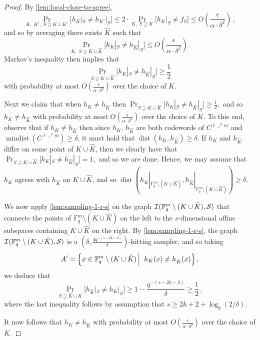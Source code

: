 \documentclass{toc}
\theoremstyle{plain}
\DeclareMathOperator{\dist}{dist} %
\DeclareMathOperator{\mindist}{mindist}  %
\newcommand{\F}{{\mathbb{F}}}
\newcommand{\calI}{{\mathcal{I}}}
\newcommand\sett[2]{\left\{ #1 \left| \; \vphantom{#1 #2} \right. #2  \right\}}
\begin{document}

\begin{proof}
By \cref{lem:local-close-to-agree},
\[
\Pr_{K, \; K',\; S \supseteq K \cup K'}\big[h_K|_S \neq h_{K'}|_S\big] \leq 2\cdot \Pr_{K, \; S \supseteq K}\big[h_K|_S \neq f_S\big] \leq O\left(\frac{\epsilon} {\alpha \cdot \delta^2}\right)\,,
\]
and so by averaging there exists $\hat K$ such that
\[
\Pr_{K, \; S \supseteq  K \cup \hat K}\big[h_{ K}|_S \neq h_{\hat K}|_S\big] \leq  O\left(\frac{\epsilon} {\alpha \cdot \delta^2}\right)\,.
\]
Markov's inequality then implies that
\[\Pr_{S \supseteq K \cup \hat K}\big[h_{ K}|_S \neq h_{ \hat K}|_S\big]  \geq \frac{1} {2}\]
with probability at most $O\left(\frac{\epsilon} {\alpha \cdot \delta^2}\right)$ over the choice of $K$.

%
Next we claim that when $h_{K} \neq h_{\hat K} $ then $\Pr_{S \supseteq K \cup \hat K}\big[h_{ K}|_S \neq h_{ \hat K}|_S\big]  \geq \frac{1} {2},$ and so $h_{K} \neq h_{\hat K}$ with probability at most $O\left(\frac{\epsilon} {\alpha \cdot \delta^2}\right)$ over the choice of $K$. To this end, observe that if $h_{K} \neq h_{\hat K} $ then since $h_{ K}$, $h_{ \hat K}$ are both codewords of $C^{\ell \nearrow m}$ and $\mindist(C^{\ell \nearrow m}) \geq \delta$, it must hold that $\dist(h_{ K}, h_{\hat K}) \geq \delta$. If $h_K$ and $h_{\hat K}$ differ on some point of $K \cup \hat K$, then we clearly have that $\Pr_{S \supseteq K \cup \hat K}\big[h_{ K}|_S \neq h_{ \hat K}|_S\big]  =1,$ and so we are done. Hence, we may assume that $h_K$ agrees with $h_{\hat K}$ on $K \cup \hat K$, and so $\dist \left(h_{ K}|_{ \F_q^m \setminus (K \cup \hat K)}, h_{\hat K}| _{  \F_q^m \setminus (K \cup \hat K)  } \right)\geq \delta$.

We now apply \cref{lem:sampling-1-r-s} on the graph $\calI ( \F_q^m \setminus (K \cup \hat K),\cal S )$ that connects the points of $\F_q^m\setminus (K \cup \hat K)$ on the left to the $s$-dimensional affine subspaces containing $K \cup \hat K$ on the right. By \cref{lem:sampling-1-r-s}, the graph $\calI ( \F_q^m \setminus (K \cup \hat K),\cal S )$ is a $(\delta, \frac{4q^{-(s-2k-2)} } {\delta})$-hitting sampler, and so taking
%
\[
A'=\sett{x\in \F_q^m \setminus (K \cup \hat K)}{h_{ K}(x)\neq h_{\hat K}(x)},
\]
we deduce that
\[
\Pr_{S \supseteq \hat K \cup K}\big[h_{\hat K}|_S \neq h_{K}|_S\big] \geq 1- \frac{ q^{-(s-2k-2)}} {\delta} \geq \frac12\,,
\]
where the last inequality follows by assumption that $s \geq 2k +2+\log_q(2/\delta)$.

%
%
%
%
%

It now follows that $h_{K} \neq h_{\hat K}$ with probability at most $O\left(\frac{\epsilon} {\alpha \cdot \delta^2}\right)$ over the choice of $K$.
\end{proof}
\end{document}
